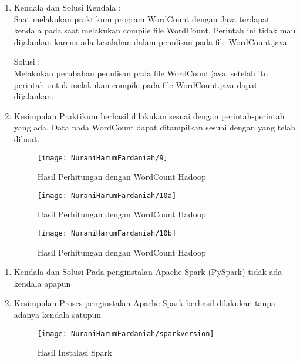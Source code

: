 \begin{enumerate}
\item Kendala dan Solusi
\newline Kendala :\\
Saat melakukan praktikum program WordCount dengan Java terdapat kendala pada saat melakukan compile file WordCount. Perintah ini tidak mau dijalankan karena ada kesalahan dalam penulisan pada file WordCount.java

Solusi :\\
Melakukan perubahan penulisan pada file WordCount.java, setelah itu perintah untuk melakukan compile pada file WordCount.java dapat dijalankan.

\item Kesimpulan
\newline Praktikum berhasil dilakukan sesuai dengan perintah-perintah yang ada. Data pada WordCount dapat ditampilkan sesuai dengan yang telah dibuat.


\begin{figure}[!ht]
\texttt{[image: NuraniHarumFardaniah/9]}
\caption{Hasil Perhitungan dengan WordCount Hadoop}
\label{gam:perkuliahan-25-11}
\end{figure}

\begin{figure}[!ht]
\texttt{[image: NuraniHarumFardaniah/10a]}
\caption{Hasil Perhitungan dengan WordCount Hadoop}
\label{gam:perkuliahan-25-11}
\end{figure}
\newpage
\begin{figure}[!ht]
\texttt{[image: NuraniHarumFardaniah/10b]}
\caption{Hasil Perhitungan dengan WordCount Hadoop}
\label{gam:perkuliahan-25-11}
\end{figure}

\end{enumerate}

\begin{enumerate}
\item Kendala dan Solusi
\newline Pada penginstalan Apache Spark (PySpark) tidak ada kendala apapun

\item Kesimpulan
\newline Proses penginstalan Apache Spark berhasil dilakukan tanpa adanya kendala satupun

\begin{figure}[!ht]
\texttt{[image: NuraniHarumFardaniah/sparkversion]}
\caption{Hasil Instalasi Spark}
\label{gam:perkuliahan-25-11}
\end{figure}

\end{enumerate}

